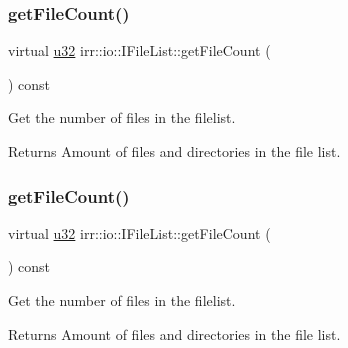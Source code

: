\subsubsection{\texorpdfstring{get\+File\+Count()}{getFileCount()}\hspace{0.1cm}{\footnotesize\ttfamily [1/2]}}
{\footnotesize\ttfamily virtual \hyperlink{namespaceirr_a0416a53257075833e7002efd0a18e804}{u32} irr\+::io\+::\+I\+File\+List\+::get\+File\+Count (\begin{DoxyParamCaption}{ }\end{DoxyParamCaption}) const\hspace{0.3cm}{\ttfamily [pure virtual]}}



Get the number of files in the filelist. 

\begin{DoxyReturn}{Returns}
Amount of files and directories in the file list. 
\end{DoxyReturn}
\mbox{\label{classirr_1_1io_1_1IFileList_a871861be76e18d58274c4580b1d103b9}} 
\subsubsection{\texorpdfstring{get\+File\+Count()}{getFileCount()}\hspace{0.1cm}{\footnotesize\ttfamily [2/2]}}
{\footnotesize\ttfamily virtual \hyperlink{namespaceirr_a0416a53257075833e7002efd0a18e804}{u32} irr\+::io\+::\+I\+File\+List\+::get\+File\+Count (\begin{DoxyParamCaption}{ }\end{DoxyParamCaption}) const\hspace{0.3cm}{\ttfamily [pure virtual]}}



Get the number of files in the filelist. 

\begin{DoxyReturn}{Returns}
Amount of files and directories in the file list. 
\end{DoxyReturn}
\mbox{\label{classirr_1_1io_1_1IFileList_ab4e0330adf34afa3c21e06ff0b4e84d5}} 
